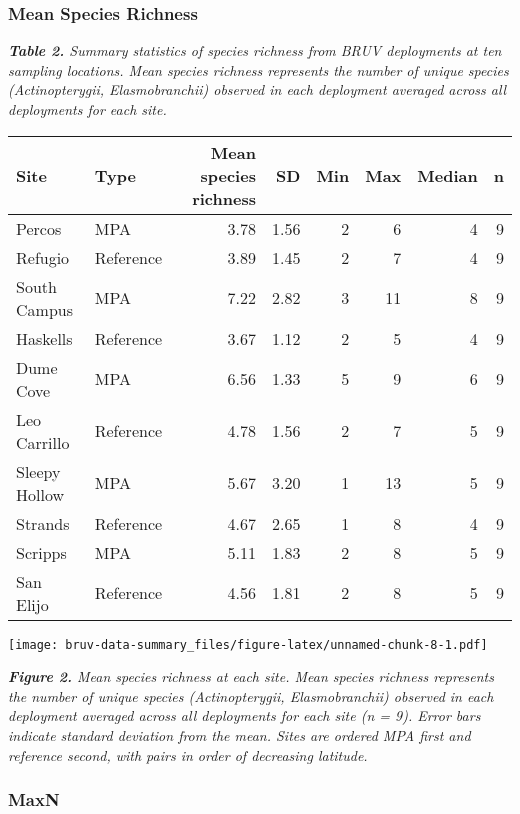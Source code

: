 \documentclass[]{article}
\begin{document}
\subsubsection{Mean Species Richness}\label{mean-species-richness}

\emph{\textbf{Table 2.} Summary statistics of species richness from BRUV
deployments at ten sampling locations. Mean species richness represents
the number of unique species (Actinopterygii, Elasmobranchii) observed
in each deployment averaged across all deployments for each site.}

\begin{table}[H]
\centering
\begin{tabular}{l|l|r|r|r|r|r|r}
\hline
Site & Type & Mean species richness & SD & Min & Max & Median & n\\
\hline
Percos & MPA & 3.78 & 1.56 & 2 & 6 & 4 & 9\\
\hline
Refugio & Reference & 3.89 & 1.45 & 2 & 7 & 4 & 9\\
\hline
South Campus & MPA & 7.22 & 2.82 & 3 & 11 & 8 & 9\\
\hline
Haskells & Reference & 3.67 & 1.12 & 2 & 5 & 4 & 9\\
\hline
Dume Cove & MPA & 6.56 & 1.33 & 5 & 9 & 6 & 9\\
\hline
Leo Carrillo & Reference & 4.78 & 1.56 & 2 & 7 & 5 & 9\\
\hline
Sleepy Hollow & MPA & 5.67 & 3.20 & 1 & 13 & 5 & 9\\
\hline
Strands & Reference & 4.67 & 2.65 & 1 & 8 & 4 & 9\\
\hline
Scripps & MPA & 5.11 & 1.83 & 2 & 8 & 5 & 9\\
\hline
San Elijo & Reference & 4.56 & 1.81 & 2 & 8 & 5 & 9\\
\hline
\end{tabular}
\end{table}

\texttt{[image: bruv-data-summary\_files/figure-latex/unnamed-chunk-8-1.pdf]}

\emph{\textbf{Figure 2.} Mean species richness at each site. Mean
species richness represents the number of unique species
(Actinopterygii, Elasmobranchii) observed in each deployment averaged
across all deployments for each site (n = 9). Error bars indicate
standard deviation from the mean. Sites are ordered MPA first and
reference second, with pairs in order of decreasing latitude.}

\subsubsection{MaxN}\label{maxn}
\end{document}
